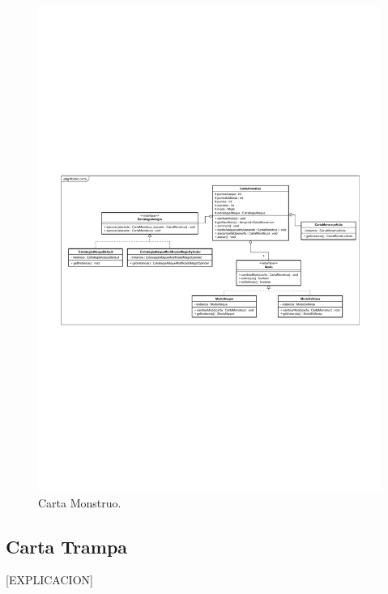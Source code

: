 \begin{figure}[H]
	\centering
	\includegraphics[scale=0.8]{includes/class_CartaMonstruo}
	\caption{Carta Monstruo.}
	\label{class_CartaMonstruo}
\end{figure}


\subsection{Carta Trampa}

[EXPLICACION]

